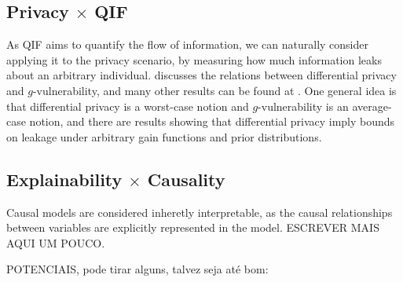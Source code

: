\subsection{Privacy $\times$ QIF}

As QIF aims to quantify the flow of information, we can naturally consider applying it to the privacy scenario, by measuring how much information leaks about an arbitrary individual. \cite{On the information leakage of Differentially Private Mechanisms} discusses the relations between differential privacy and $g$-vulnerability, and many other results can be found at \cite{QIF}. One general idea is that differential privacy is a worst-case notion and $g$-vulnerability is an average-case notion, and there are results showing that differential privacy imply bounds on leakage under arbitrary gain functions and prior distributions.

\subsection{Explainability $\times$ Causality}

Causal models are considered inheretly interpretable, as the causal relationships between variables are explicitly represented in the model. {\color{red} ESCREVER MAIS AQUI UM POUCO.}

{\color{red}POTENCIAIS, pode tirar alguns, talvez seja até bom:}

